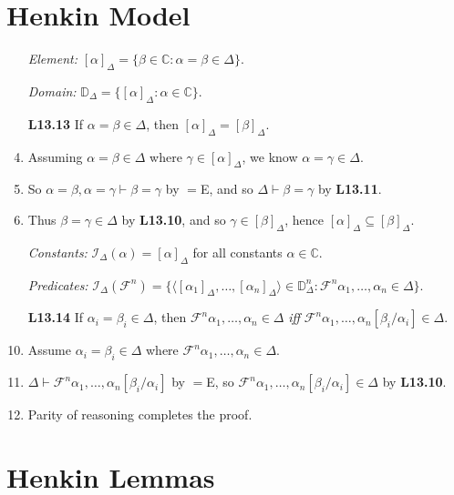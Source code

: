 \documentclass[a4paper, 11pt]{article} %
\def\proves{\ensuremath{\vdash}}
\newcommand{\tuple}[1]{\langle#1\rangle} %
\newcommand{\set}[1]{\lbrace#1\rbrace} %
\newcommand{\I}{\mathcal{I}}
\newcommand{\F}{\mathcal{F}}
\newcommand{\M}{\mathcal{M}}
\newcommand{\D}{\mathbb{D}}
\newcommand{\C}{\mathbb{C}}
\newcommand{\unisub}[2]{[#1/#2]}
\def\metaA{\ensuremath{\varphi}}
\begin{document}
\section*{Henkin Model}

\begin{enumerate}
  \item[\it Element:] $[\alpha]_\Delta=\set{\beta\in\C:\alpha=\beta\in\Delta}$.
  \item[\it Domain:] $\D_\Delta=\set{[\alpha]_\Delta:\alpha\in\C}$.
  \item[\bf L13.13] If $\alpha=\beta\in\Delta$, then $[\alpha]_\Delta=[\beta]_\Delta$.
  \item Assuming $\alpha=\beta\in\Delta$ where $\gamma\in[\alpha]_\Delta$, we know $\alpha=\gamma\in\Delta$.
  \item So $\alpha=\beta,\alpha=\gamma\proves\beta=\gamma$ by $=$E, and so $\Delta\proves\beta=\gamma$ by \textbf{L13.11}.
  \item Thus $\beta=\gamma\in\Delta$ by \textbf{L13.10}, and so $\gamma\in[\beta]_\Delta$, hence $[\alpha]_\Delta\subseteq[\beta]_\Delta$.
  \item[\it Constants:] $\I_\Delta(\alpha)=[\alpha]_\Delta$ for all constants $\alpha\in\C$.
  \item[\it Predicates:] $\I_\Delta(\F^n)=\set{\tuple{[\alpha_1]_\Delta,\ldots,[\alpha_n]_\Delta}\in\D_\Delta^n:\F^n\alpha_1,\ldots,\alpha_n\in\Delta}$.
  \item[\bf L13.14] If $\alpha_i=\beta_i\in\Delta$, then $\F^n\alpha_1,\ldots,\alpha_n\in\Delta$ \textit{iff} $\F^n\alpha_1,\ldots,\alpha_n\unisub{\beta_i}{\alpha_i}\in\Delta$.
    \setcounter{enumi}{0}
  \item Assume $\alpha_i=\beta_i\in\Delta$ where $\F^n\alpha_1,\ldots,\alpha_n\in\Delta$.
  \item $\Delta\proves\F^n\alpha_1,\ldots,\alpha_n\unisub{\beta_i}{\alpha_i}$ by $=$E, so $\F^n\alpha_1,\ldots,\alpha_n\unisub{\beta_i}{\alpha_i}\in\Delta$ by \textbf{L13.10}.
  \item Parity of reasoning completes the proof.
\end{enumerate}




\section*{Henkin Lemmas}
\end{document}
